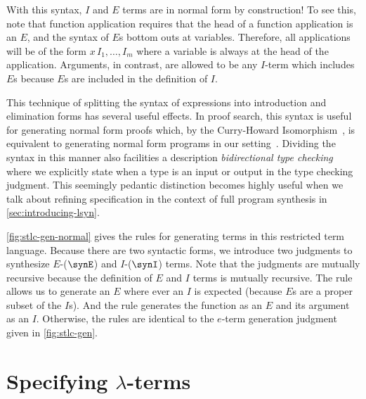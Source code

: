 With this syntax, $I$ and $E$ terms are in normal form by construction!
To see this, note that function application requires that the head of a function application is an $E$, and the syntax of $E$s bottom outs at variables.
Therefore, all applications will be of the form $x\,I_1, …, I_m$ where a variable is always at the head of the application.
Arguments, in contrast, are allowed to be any $I$-term which includes $E$s because $E$s are included in the definition of $I$.

This technique of splitting the syntax of expressions into introduction and elimination forms has several useful effects.
In proof search, this syntax is useful for generating normal form proofs which, by the Curry-Howard Isomorphism~, is equivalent to generating normal form programs in our setting~.
Dividing the syntax in this manner also facilities a description \emph{bidirectional type checking}~ where we explicitly state when a type is an input or output in the type checking judgment.
This seemingly pedantic distinction becomes highly useful when we talk about refining specification in the context of full program synthesis in \autoref{sec:introducing-lsyn}.



\autoref{fig:stlc-gen-normal} gives the rules for generating \stlc{} terms in this restricted term language.
Because there are two syntactic forms, we introduce two judgments to synthesize $E$-($\synE$) and $I$-($\synI$) terms.
Note that the judgments are mutually recursive because the definition of $E$ and $I$ terms is mutually recursive.
The rule  allows us to generate an $E$ where ever an $I$ is expected (because $E$s are a proper subset of the $I$s).
And the rule  generates the function as an $E$ and its argument as an $I$.
Otherwise, the rules are identical to the $e$-term generation judgment given in \autoref{fig:stlc-gen}.

\section{Specifying \texorpdfstring{$λ$}{λ}-terms}
\label{sec:specifying-lambda-terms}

